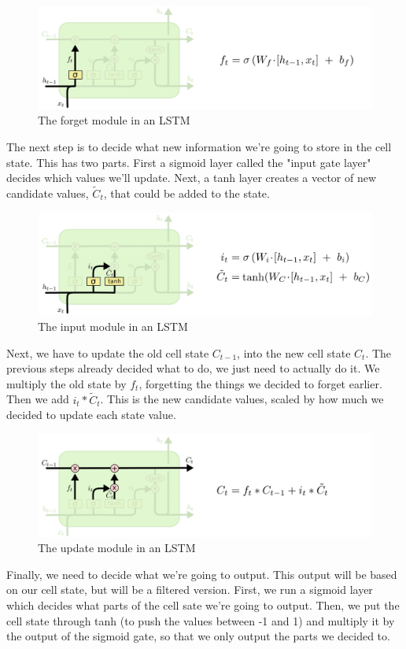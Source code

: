 \documentclass{article}
\begin{document}
\begin{figure}[htbp]
  \centering
  \includegraphics[width=0.6\linewidth]{img/lstm_forget.png}
  \caption{The forget module in an LSTM}
  \label{fig:lstm_forget}
\end{figure}

The next step is to decide what new information we're going to store in the cell state.
This has two parts.
First a sigmoid layer called the "input gate layer" decides which values we'll update.
Next, a tanh layer creates a vector of new candidate values, $\tilde{C}_t$, that could be added to the state.

\begin{figure}[htbp]
  \centering
  \includegraphics[width=0.6\linewidth]{img/lstm_input.png}
  \caption{The input module in an LSTM}
  \label{fig:lstm_input}
\end{figure}

Next, we have to update the old cell state $C_{t-1}$, into the new cell state $C_t$.
The previous steps already decided what to do, we just need to actually do it.
We multiply the old state by $f_t$, forgetting the things we decided to forget earlier.
Then we add $i_t * \tilde{C}_t$.
This is the new candidate values, scaled by how much we decided to update each state value.

\begin{figure}[htbp]
  \centering
  \includegraphics[width=0.6\linewidth]{img/lstm_update.png}
  \caption{The update module in an LSTM}
  \label{fig:lstm_update}
\end{figure}

Finally, we need to decide what we're going to output.
This output will be based on our cell state, but will be a filtered version.
First, we run a sigmoid layer which decides what parts of the cell sate we're going to output.
Then, we put the cell state through tanh (to push the values between -1 and 1) and multiply it by the output of the sigmoid gate, so that we only output the parts we decided to.
\end{document}
